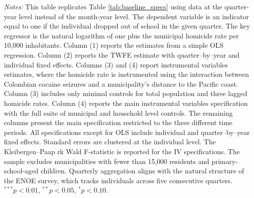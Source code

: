 \documentclass[12pt,letter,english,intoc,bibliography=totoc,index=totoc,BCOR10mm,captions=tableheading,nottitlepage,fleqn]{article}
\theoremstyle{break}
\begin{document}
\begin{table}[H]
\centering
\caption{Quarterly Baseline Estimates}
\label{tab:main_iv_quarterly}
\centering
\scriptsize 

\begin{minipage}{0.95\linewidth}
    \scriptsize \singlespacing
    \textit{Notes:} This table replicates Table \ref{tab:baseline_specs} using data at the quarter-year level instead of the month-year level. The dependent variable is an indicator equal to one if the individual dropped out of school in the given quarter. The key regressor is the natural logarithm of one plus the municipal homicide rate per 10{,}000 inhabitants. Column (1) reports the estimates from a simple OLS regression. Column (2) reports the TWFE estimate with quarter--by--year and individual fixed effects. Columns (3) and (4) report instrumental variables estimates, where the homicide rate is instrumented using the interaction between Colombian cocaine seizures and a municipality's distance to the Pacific coast. Column (3) includes only minimal controls for total population and three lagged homicide rates. Column (4) reports the main instrumental variables specification with the full suite of municipal and household level controls. The remaining columns present the main specification restricted to the three different time periods. All specifications except for OLS include individual and quarter--by--year fixed effects. Standard errors are clustered at the individual level. The Kleibergen--Paap rk Wald F-statistic is reported for the IV specifications. The sample excludes municipalities with fewer than 15{,}000 residents and primary-school-aged children. Quarterly aggregation aligns with the natural structure of the ENOE survey, which tracks individuals across five consecutive quarters. $^{***}p<0.01$, $^{**}p<0.05$, $^{*}p<0.10$.
    \end{minipage}
\end{table}
\end{document}
